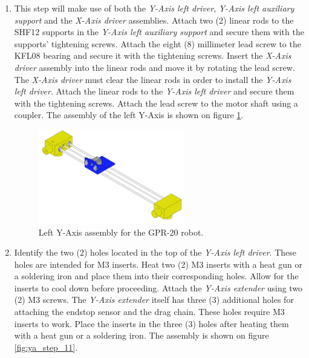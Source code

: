 \documentclass{article}
\begin{document}
\begin{enumerate}
    \item This step will make use of both the \textit{Y-Axis left driver}, \textit{Y-Axis left auxiliary support} and the \textit{X-Axis driver} assemblies. Attach two (2) linear rods to the SHF12 supports in the \textit{Y-Axis left auxiliary support} and secure them with the supports' tightening screws. Attach the eight (8) millimeter lead screw to the KFL08 bearing and secure it with the tightening screws. Insert the \textit{X-Axis driver} assembly into the linear rods and move it by rotating the lead screw. The \textit{X-Axis driver} must clear the linear rods in order to install the \textit{Y-Axis left driver}. Attach the linear rods to the \textit{Y-Axis left driver} and secure them with the tightening screws. Attach the lead screw to the motor shaft using a coupler. The assembly of the left Y-Axis is shown on figure \ref{fig:ya_step_10}.
    
    \begin{figure}[H]
        \centering
        \includegraphics[width=0.6\textwidth]{images/y_axis/step_J.png}
        \caption{Left Y-Axis assembly for the GPR-20 robot.}
        \label{fig:ya_step_10}
    \end{figure}
    
    \item Identify the two (2) holes located in the top of the \textit{Y-Axis left driver}. These holes are intended for M3 inserts. Heat two (2) M3 inserts with a heat gun or a soldering iron and place them into their corresponding holes. Allow for the inserts to cool down before proceeding. Attach the \textit{Y-Axis extender} using two (2) M3 screws. The \textit{Y-Axis extender} itself has three (3) additional holes for attaching the endstop sensor and the drag chain. These holes require M3 inserts to work. Place the inserts in the three (3) holes after heating them with a heat gun or a soldering iron. The assembly is shown on figure \ref{fig:ya_step_11}.
    

\end{enumerate}
\end{document}
